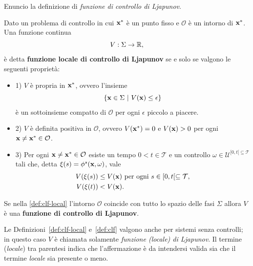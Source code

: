 Enuncio la definizione di \emph{funzione di controllo di Ljapunov}.
\begin{definition}
    \label{def:clf-local}
    Dato un problema di controllo in cui $\mathbf{x}^*$ è un punto fisso e
    $\mathcal O$ è un intorno di $\mathbf{x}^*$.
    Una funzione continua
    \begin{equation*}
        V : \Sigma \to \mathbb{R},
    \end{equation*}
    è detta \textbf{funzione locale di controllo di Ljapunov} se
    e solo se valgono le seguenti proprietà:

    \begin{itemize}
        \item 1) $V$ è propria in $\mathbf{x}^*$, ovvero l'insieme
        \begin{equation*}
            \left\{\mathbf{x} \in \Sigma\ |\ V(\mathbf{x}) \leq \epsilon \right\}
        \end{equation*}
        è un sottoinsieme compatto di $\mathcal O$ per ogni $\epsilon$ piccolo a piacere.
        \item 2) $V$ è definita positiva in $\mathcal O$, ovvero $V(\mathbf{x}^*) = 0$ e
        $V(\mathbf{x}) > 0$ per ogni $\mathbf{x} \neq \mathbf{x}^* \in \mathcal O$.
        \item 3) Per ogni $\mathbf{x} \neq \mathbf{x}^* \in \mathcal O$
        esiste un tempo $0 < t \in \mathcal T$ e un controllo $\omega \in \mathcal U^{[0,t[ \subseteq \mathcal T}$
        tali che, detta $\xi(s) = \phi^s(\mathbf{x}, \omega)$, vale
        \begin{align*}
            V(\xi(s)) &\leq V(\mathbf{x}) \text{ per ogni } s \in [0,t[ \subseteq \mathcal T, \\
            V(\xi(t)) &< V(\mathbf{x}).
        \end{align*}
    \end{itemize}
\end{definition}

\begin{definition}
    Se nella \autoref{def:clf-local} l'intorno $\mathcal O$ coincide
    con tutto lo spazio delle fasi $\Sigma$ allora $V$ è una
    \textbf{funzione di controllo di Ljapunov}.
    \label{def:clf}
\end{definition}

Le Definizioni~\ref{def:clf-local} e~\ref{def:clf} valgono anche per sistemi
senza controlli; in questo caso $V$ è chiamata solamente \emph{funzione (locale) di Ljapunov}.
Il termine (\emph{locale}) tra parentesi indica che l'affermazione è da intendersi valida
sia che il termine \emph{locale} sia presente o meno.

